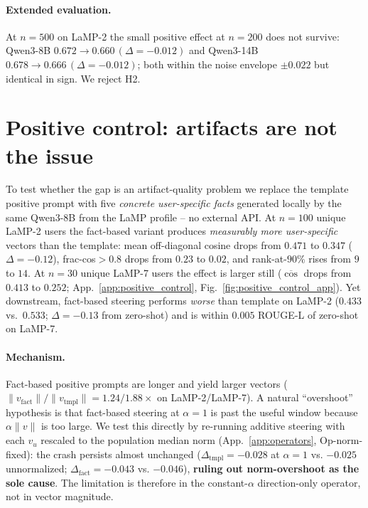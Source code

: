 \documentclass{article}
\begin{document}
\paragraph{Extended evaluation.} At $n{=}500$ on LaMP-2 the small
positive effect at $n{=}200$ does not survive: Qwen3-8B
$0.672 \to 0.660\,(\Delta{=}{-}0.012)$ and Qwen3-14B
$0.678 \to 0.666\,(\Delta{=}{-}0.012)$; both within the noise envelope
$\pm 0.022$ but identical in sign. We reject H2.

\section{Positive control: artifacts are not the issue}
\label{sec:positive_control}

To test whether the gap is an artifact-quality problem we replace the
template positive prompt with five \emph{concrete user-specific facts}
generated locally by the same Qwen3-8B from the LaMP profile -- no
external API. At $n{=}100$ unique LaMP-2 users the fact-based variant
produces \emph{measurably more user-specific} vectors than the template:
mean off-diagonal cosine drops from $0.471$ to $0.347$ ($\Delta{=}{-}0.12$),
frac-cos$>\!0.8$ drops from $0.23$ to $0.02$, and rank-at-$90\%$ rises
from $9$ to $14$.  At $n{=}30$ unique LaMP-7 users the effect is
larger still ($\overline{\cos}$ drops from $0.413$ to $0.252$;
App.~\ref{app:positive_control}, Fig.~\ref{fig:positive_control_app}).
Yet downstream, fact-based steering performs \emph{worse} than
template on LaMP-2 ($0.433$ vs.\ $0.533$; $\Delta{=}{-}0.13$ from
zero-shot) and is within $0.005$ ROUGE-L of zero-shot on LaMP-7.

\paragraph{Mechanism.}  Fact-based positive prompts are longer and
yield larger vectors ($\|v_{\text{fact}}\|/\|v_{\text{tmpl}}\|
{=}1.24/1.88\times$ on LaMP-2/LaMP-7).  A natural ``overshoot''
hypothesis is that fact-based steering at $\alpha{=}1$ is past the
useful window because $\alpha\|v\|$ is too large.  We test this
directly by re-running additive steering with each $v_u$ rescaled
to the population median norm (App.~\ref{app:operators},
Op-norm-fixed): the crash persists almost unchanged
($\Delta_{\text{tmpl}}{=}{-}0.028$ at $\alpha{=}1$ vs. $-0.025$
unnormalized; $\Delta_{\text{fact}}{=}{-}0.043$ vs. $-0.046$),
\textbf{ruling out norm-overshoot as the sole cause}.  The
limitation is therefore in the constant-$\alpha$ direction-only
operator, not in vector magnitude.
\end{document}
